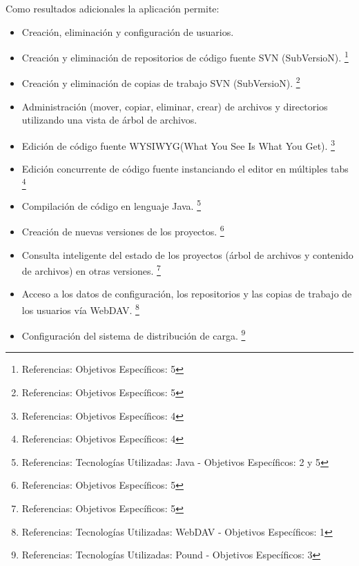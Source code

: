 Como resultados adicionales la aplicación permite:

\begin{itemize}
	
	\item Creación, eliminación y configuración de usuarios.
	
	\item Creación y eliminación de repositorios de código fuente SVN (SubVersioN).
	\footnote {Referencias: Objetivos Específicos: 5}
	
	\item Creación y eliminación de copias de trabajo SVN (SubVersioN).
	\footnote {Referencias: Objetivos Específicos: 5}
	
	\item Administración (mover, copiar, eliminar, crear) de archivos y directorios utilizando una vista de árbol de archivos.
	
	\item Edición de código fuente WYSIWYG(What You See Is What You Get).
	\footnote {Referencias: Objetivos Específicos: 4}
	
	\item Edición concurrente de código fuente instanciando el editor en múltiples tabs
	\footnote {Referencias: Objetivos Específicos: 4}
	
	\item Compilación de código en lenguaje Java.
	\footnote {Referencias: Tecnologías Utilizadas: Java - Objetivos Específicos: 2 y 5}
	
	\item Creación de nuevas versiones de los proyectos.
	\footnote {Referencias: Objetivos Específicos: 5}
	
	\item Consulta inteligente del estado de los proyectos (árbol de archivos y contenido de archivos) en otras versiones.
	\footnote {Referencias: Objetivos Específicos: 5}
	
	\item Acceso a los datos de configuración, los repositorios y las copias de trabajo de los usuarios vía WebDAV.
	\footnote {Referencias: Tecnologías Utilizadas: WebDAV - Objetivos Específicos: 1}
	
	\item Configuración del sistema de distribución de carga.
	\footnote {Referencias: Tecnologías Utilizadas: Pound - Objetivos Específicos: 3}
	
\end{itemize}

